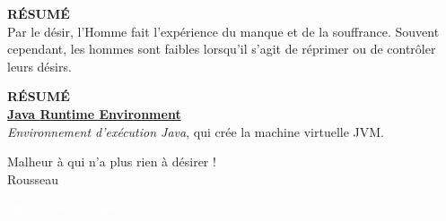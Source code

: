 \documentclass{article}%
\begin{document}
\begin{solution}[linecolor=summary, backgroundcolor=summary-bg]
{ \scriptsize \textcolor{summary}{ \textbf{RÉSUMÉ}}}
\vspace{3px}
\\ Par le désir, l'Homme fait l'expérience du manque et de la souffrance. Souvent cependant, les hommes sont faibles lorsqu'il s'agit de réprimer ou de contrôler leurs désirs.
\end{solution}

\begin{solution}[linecolor=definition, backgroundcolor=definition-bg]
{ \scriptsize \textcolor{definition}{ \textbf{RÉSUMÉ}}}
\vspace{3px}
\\ \underline{\textbf{Java Runtime Environment}}
\vspace{2.5px}
\\ \textit{Environnement d'exécution Java}, qui crée la machine virtuelle JVM.
\end{solution}

\begin{mdframed}[topline=false, bottomline=false, linecolor=border-color]
\begin{center}
    Malheur à qui n'a plus rien à désirer !
    \\ Rousseau
\end{center}
\end{mdframed}

\begin{solution}[linecolor=code-bg, backgroundcolor=code-bg]
\textcolor{white}{\texttt{npm install puppeteer}}
\end{solution}

%
\end{document}
